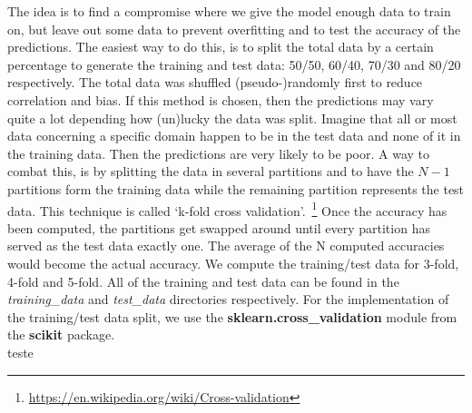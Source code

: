 The idea is to find a compromise where we give the model enough data to train on, but leave out some data to prevent overfitting and to test the accuracy of the predictions. The easiest way to do this, is to split the total data by a certain percentage to generate the training and test data: 50/50, 60/40, 70/30 and 80/20 respectively. The total data was shuffled (pseudo-)randomly first to reduce correlation and bias. If this method is chosen, then the predictions may vary quite a lot depending how (un)lucky the data was split. Imagine that all or most data concerning a specific domain happen to be in the test data and none of it in the training data. Then the predictions are very likely to be poor. A way to combat this, is by splitting the data in several partitions and to have the $N-1$ partitions form the training data while the remaining partition represents the test data. This technique is called `k-fold cross validation'.~\footnote{\url{https://en.wikipedia.org/wiki/Cross-validation}} Once the accuracy has been computed, the partitions get swapped around until every partition has served as the test data exactly one. The average of the N computed accuracies would become the actual accuracy. We compute the training/test data for 3-fold, 4-fold and 5-fold. All of the training and test data can be found in the \textit{training\_data} and \textit{test\_data} directories respectively. For the implementation of the training/test data split, we use the \textbf{sklearn.cross\_validation} module from the \textbf{scikit} package.
\\[2ex]
teste

